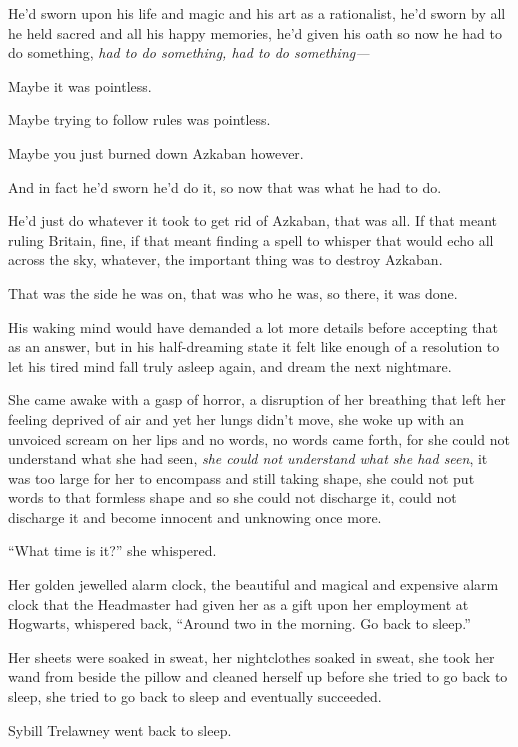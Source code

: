 He’d sworn upon his life and magic and his art as a rationalist, he’d sworn by all he held sacred and all his happy memories, he’d given his oath so now he had to do something, \emph{had to do something, had to \emph{do something—}}

Maybe it was pointless.

Maybe trying to follow rules was pointless.

Maybe you just burned down Azkaban however.

And in fact he’d sworn he’d do it, so now that was what he had to do.

He’d just do whatever it took to get rid of Azkaban, that was all. If that meant ruling Britain, fine, if that meant finding a spell to whisper that would echo all across the sky, whatever, the important thing was to destroy Azkaban.

That was the side he was on, that was who he was, so there, it was done.

His waking mind would have demanded a lot more details before accepting that as an answer, but in his half-dreaming state it felt like enough of a resolution to let his tired mind fall truly asleep again, and dream the next nightmare.


She came awake with a gasp of horror, a disruption of her breathing that left her feeling deprived of air and yet her lungs didn’t move, she woke up with an unvoiced scream on her lips and no words, no words came forth, for she could not understand what she had seen, \emph{she could not understand what she had seen}, it was too large for her to encompass and still taking shape, she could not put words to that formless shape and so she could not discharge it, could not discharge it and become innocent and unknowing once more.

“What time is it?” she whispered.

Her golden jewelled alarm clock, the beautiful and magical and expensive alarm clock that the Headmaster had given her as a gift upon her employment at Hogwarts, whispered back, “Around two in the morning. Go back to sleep.”

Her sheets were soaked in sweat, her nightclothes soaked in sweat, she took her wand from beside the pillow and cleaned herself up before she tried to go back to sleep, she tried to go back to sleep and eventually succeeded.

Sybill Trelawney went back to sleep.

